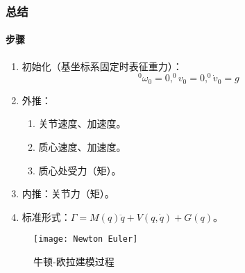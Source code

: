 \documentclass[
12pt, %
a4paper, 
oneside, %
headinclude,footinclude, %
]{scrartcl}
\begin{document}
\subsubsection[总结]{总结}
\begin{minipage}{0.55\textwidth}
\paragraph{步骤}
\begin{enumerate}
\item 初始化（基坐标系固定时表征重力）：
$$ ^0\omega_0 = 0, ^0v_0 = 0, ^0\dot{v}_0 = g $$
\item 外推：
\begin{enumerate}
\item 关节速度、加速度。
\item 质心速度、加速度。
\item 质心处受力（矩）。
\end{enumerate}
\item 内推：关节力（矩）。
\item 标准形式：$ \Gamma = M(q)\ddot{q} + V(q, \dot{q}) + G(q) $。
\end{enumerate}
\end{minipage}
\hfill
\begin{minipage}{0.4\textwidth}
\begin{figure}[H]
\centering 
\texttt{[image: Newton Euler]} 
\caption[牛顿-欧拉建模过程]{牛顿-欧拉建模过程}
\end{figure}
\end{minipage}
\end{document}
